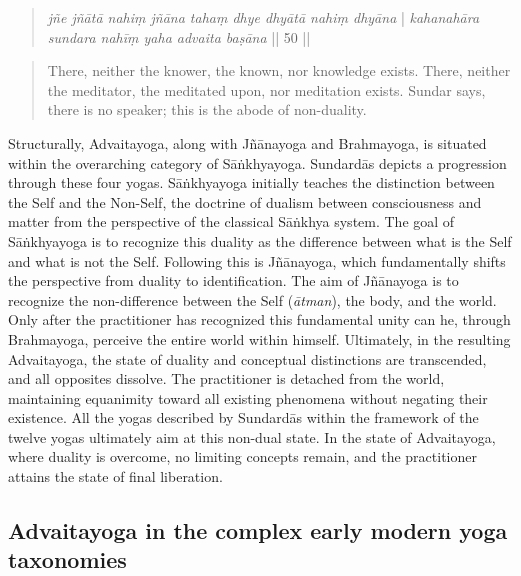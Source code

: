\begin{quote}
\textit{jñe jñātā nahiṃ jñāna tahaṃ dhye dhyātā nahiṃ dhyāna} |
\textit{kahanahāra sundara nahīṃ yaha advaita baṣāna} || 50 || 
\end{quote}
\begin{quote}
There, neither the knower, the known, nor knowledge exists. There, neither the meditator, the meditated upon, nor meditation exists. Sundar says, there is no speaker; this is the abode of non-duality.
\end{quote}

Structurally, Advaitayoga, along with Jñānayoga and Brahmayoga, is situated within the overarching category of Sāṅkhyayoga. Sundardās depicts a progression through these four yogas. Sāṅkhyayoga initially teaches the distinction between the Self and the Non-Self, the doctrine of dualism between consciousness and matter from the perspective of the classical Sāṅkhya system. The goal of Sāṅkhyayoga is to recognize this duality as the difference between what is the Self and what is not the Self. Following this is Jñānayoga, which fundamentally shifts the perspective from duality to identification. The aim of Jñānayoga is to recognize the non-difference between the Self (\textit{ātman}), the body, and the world. Only after the practitioner has recognized this fundamental unity can he, through Brahmayoga, perceive the entire world within himself. Ultimately, in the resulting Advaitayoga, the state of duality and conceptual distinctions are transcended, and all opposites dissolve. The practitioner is detached from the world, maintaining equanimity toward all existing phenomena without negating their existence. All the yogas described by Sundardās within the framework of the twelve yogas ultimately aim at this non-dual state. In the state of Advaitayoga, where duality is overcome, no limiting concepts remain, and the practitioner attains the state of final liberation.

\subsection{Advaitayoga in the complex early modern yoga taxonomies}

